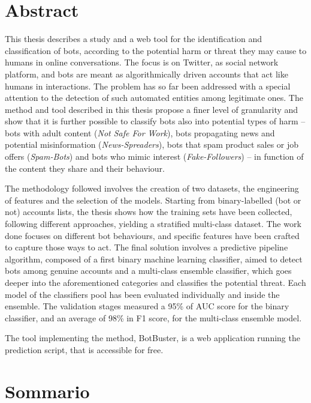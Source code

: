 
\newpage
\chapter*{Abstract}


This thesis describes a study and a web tool for the identification and classification of bots, according to the potential harm or threat they may cause to humans in online conversations. The focus is on Twitter, as social network platform, and bots are meant as algorithmically driven accounts that act like humans in interactions.
The problem has so far been addressed with a special attention to the detection of such automated entities among legitimate ones. The method and tool described in this thesis propose a finer level of granularity and show that it is further possible to classify bots also into potential types of harm --  bots with adult content (\textit{Not Safe For Work}), bots propagating news and potential misinformation (\textit{News-Spreaders}), bots that spam product sales or job offers (\textit{Spam-Bots}) and bots who mimic interest (\textit{Fake-Followers}) -- in function of the content they share and their behaviour.

The methodology followed involves the creation of two datasets, the engineering of features and the selection of the models.
Starting from binary-labelled (bot or not) accounts lists, the thesis shows how the training sets have been collected, following different approaches, yielding a stratified multi-class dataset.
The work done focuses on different bot behaviours, and specific features have been crafted to capture those ways to act.
The final solution involves a predictive pipeline algorithm, composed of a first binary machine learning classifier, aimed to detect bots among genuine accounts and a multi-class ensemble classifier, which goes deeper into the aforementioned categories and classifies the potential threat.
Each model of the classifiers pool has been evaluated individually and inside the ensemble. The validation stages measured a 95\% of AUC score for the binary classifier, and an average of 98\% in F1 score, for the multi-class ensemble model.

The tool implementing the method, BotBuster, is a web application running the prediction script, that is accessible for free.



\newpage
\chapter*{Sommario}

